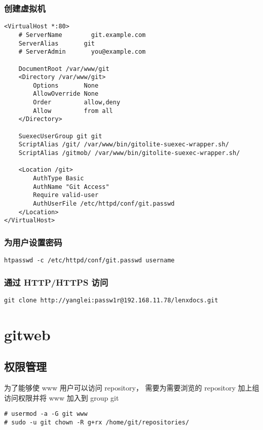 \documentclass[a4paper,11pt,twoside,openany]{article}
\begin{document}
\subsubsection{创建虚拟机}

\begin{lstlisting}
<VirtualHost *:80>
    # ServerName        git.example.com
    ServerAlias       git
    # ServerAdmin       you@example.com

    DocumentRoot /var/www/git
    <Directory /var/www/git>
        Options       None
        AllowOverride None
        Order         allow,deny
        Allow         from all
    </Directory>

    SuexecUserGroup git git
    ScriptAlias /git/ /var/www/bin/gitolite-suexec-wrapper.sh/
    ScriptAlias /gitmob/ /var/www/bin/gitolite-suexec-wrapper.sh/

    <Location /git>
        AuthType Basic
        AuthName "Git Access"
        Require valid-user
        AuthUserFile /etc/httpd/conf/git.passwd
    </Location>
</VirtualHost>

\end{lstlisting}

\subsubsection{为用户设置密码}
\begin{lstlisting}
htpasswd -c /etc/httpd/conf/git.passwd username
\end{lstlisting}

\subsubsection{通过 HTTP/HTTPS 访问}
\begin{lstlisting}
git clone http://yanglei:passw1r@192.168.11.78/lenxdocs.git
\end{lstlisting}

\section{gitweb}
\subsection{权限管理}
为了能够使 www 用户可以访问 repository， 需要为需要浏览的 repository 加上组访问权限并将 www 加入到 group git

\begin{lstlisting}
# usermod -a -G git www
# sudo -u git chown -R g+rx /home/git/repositories/
\end{lstlisting}
\end{document}
